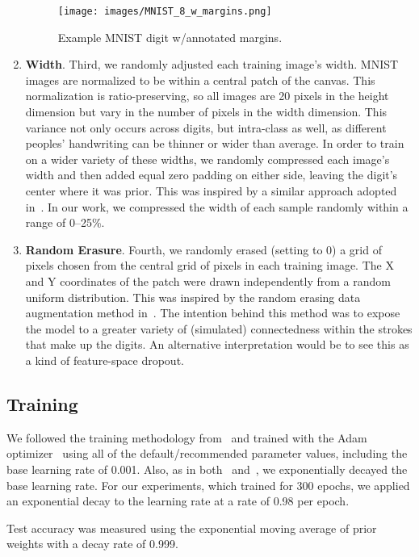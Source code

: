 \documentclass{article}
\newcommand{\rightparenthesis}{)}
\begin{document}
\begin{enumerate}[label=\arabic*\rightparenthesis]
\begin{figure}[ht]
  \centering
  \texttt{[image: images/MNIST\_8\_w\_margins.png]}
  \caption{Example MNIST digit w/annotated margins.}\label{fig:example_mnist_digit}
\end{figure}

\item \textbf{Width}.  Third, we randomly adjusted each training image's width.  MNIST images are normalized to be within a  central patch of the  canvas.  This normalization is ratio-preserving, so all images are 20 pixels in the height dimension but vary in the number of pixels in the width dimension.  This variance not only occurs across digits, but intra-class as well, as different peoples' handwriting can be thinner or wider than average.  In order to train on a wider variety of these widths, we randomly compressed each image's width and then added equal zero padding on either side, leaving the digit's center where it was prior.  This was inspired by a similar approach adopted in~\cite{Ciresan2012}.  In our work, we compressed the width of each sample randomly within a range of 0--25\%.
\item \textbf{Random Erasure}.  Fourth, we randomly erased (setting to 0) a  grid of pixels chosen from the central  grid of pixels in each training image.  The X and Y coordinates of the patch were drawn independently from a random uniform distribution.  This was inspired by the random erasing data augmentation method in~\cite{Zhong2017}.  The intention behind this method was to expose the model to a greater variety of (simulated) connectedness within the strokes that make up the digits.  An alternative interpretation would be to see this as a kind of feature-space dropout.
\end{enumerate}

\subsection{Training}

We followed the training methodology from~\cite{Byerly2019} and trained with the Adam optimizer~\cite{Kingma2014} using all of the default/recommended parameter values, including the base learning rate of 0.001.  Also, as in both~\cite{Byerly2019} and~\cite{Sabour2017}, we exponentially decayed the base learning rate.  For our experiments, which trained for 300 epochs, we applied an exponential decay to the learning rate at a rate of 0.98 per epoch.

Test accuracy was measured using the exponential moving average of prior weights with a decay rate of 0.999.~\cite{Izmailov2018}
\end{document}
